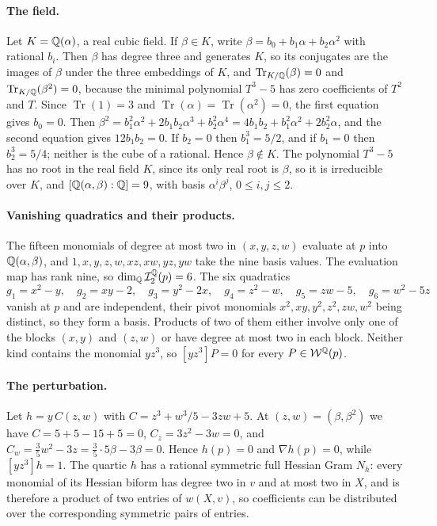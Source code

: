 \paragraph{The field.}
Let $K=\mathbb Q(\alpha)$, a real cubic field. If $\beta\in K$, write
$\beta=b_0+b_1\alpha+b_2\alpha^2$ with rational $b_i$. Then $\beta$ has
degree three and generates $K$, so its conjugates are the images of $\beta$
under the three embeddings of $K$, and $\operatorname{Tr}_{K/\mathbb Q}(\beta)=0$
and $\operatorname{Tr}_{K/\mathbb Q}(\beta^2)=0$, because the minimal polynomial
$T^3-5$ has zero coefficients of $T^2$ and $T$. Since
$\operatorname{Tr}(1)=3$ and $\operatorname{Tr}(\alpha)=\operatorname{Tr}(\alpha^2)=0$,
the first equation gives $b_0=0$. Then
$\beta^2=b_1^2\alpha^2+2b_1b_2\alpha^3+b_2^2\alpha^4
=4b_1b_2+b_1^2\alpha^2+2b_2^2\alpha$, and the second equation gives
$12b_1b_2=0$. If $b_2=0$ then $b_1^3=5/2$, and if $b_1=0$ then
$b_2^3=5/4$; neither is the cube of a rational. Hence $\beta\notin K$. The
polynomial $T^3-5$ has no root in the real field $K$, since its only real
root is $\beta$, so it is irreducible over $K$, and
$[\mathbb Q(\alpha,\beta):\mathbb Q]=9$, with basis $\alpha^i\beta^j$, $0\le i,j\le2$.

\paragraph{Vanishing quadratics and their products.}
The fifteen monomials of degree at most two in $(x,y,z,w)$ evaluate at
$p$ into $\mathbb Q(\alpha,\beta)$, and $1,x,y,z,w,xz,xw,yz,yw$ take the nine basis
values. The evaluation map has rank nine, so
$\dim_\mathbb Q\mathcal I_2^\mathbb Q(p)=6$. The six quadratics
\[
 g_1=x^2-y,\quad g_2=xy-2,\quad g_3=y^2-2x,\quad
 g_4=z^2-w,\quad g_5=zw-5,\quad g_6=w^2-5z
\]
vanish at $p$ and are independent, their pivot monomials
$x^2,xy,y^2,z^2,zw,w^2$ being distinct, so they form a basis. Products of two
of them either involve only one of the blocks $(x,y)$ and $(z,w)$ or have
degree at most two in each block. Neither kind contains the monomial
$yz^3$, so $[yz^3]P=0$ for every $P\in\mathcal W^\mathbb Q(p)$.

\paragraph{The perturbation.}
Let $h=y\,C(z,w)$ with $C=z^3+w^3/5-3zw+5$. At $(z,w)=(\beta,\beta^2)$ we have
$C=5+5-15+5=0$, $C_z=3z^2-3w=0$, and $C_w=\frac35w^2-3z=\frac35\cdot5\beta-3\beta=0$.
Hence $h(p)=0$ and $\nabla h(p)=0$, while $[yz^3]h=1$. The quartic $h$ has a
rational symmetric full Hessian Gram $N_h$: every monomial of its Hessian
biform has degree two in $v$ and at most two in $X$, and is therefore a
product of two entries of $w(X,v)$, so coefficients can be distributed over
the corresponding symmetric pairs of entries.

